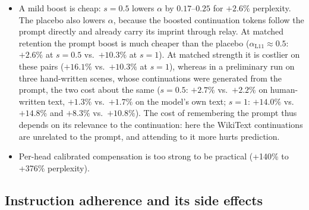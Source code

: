 \documentclass[11pt]{article}
\theoremstyle{definition}
\theoremstyle{remark}
\begin{document}
\begin{itemize}
  \item A mild boost is cheap: $s=0.5$ lowers $\alpha$ by $0.17$--$0.25$ for $+2.6\%$ perplexity. The placebo also lowers $\alpha$, because the boosted continuation tokens follow the prompt directly and already carry its imprint through relay. At matched retention the prompt boost is much cheaper than the placebo ($\alpha_{\text{L11}}\approx0.5$: $+2.6\%$ at $s=0.5$ vs.\ $+10.3\%$ at $s=1$). At matched strength it is costlier on these pairs ($+16.1\%$ vs.\ $+10.3\%$ at $s=1$), whereas in a preliminary run on three hand-written scenes, whose continuations were generated from the prompt, the two cost about the same ($s=0.5$: $+2.7\%$ vs.\ $+2.2\%$ on human-written text, $+1.3\%$ vs.\ $+1.7\%$ on the model's own text; $s=1$: $+14.0\%$ vs.\ $+14.8\%$ and $+8.3\%$ vs.\ $+10.8\%$). The cost of remembering the prompt thus depends on its relevance to the continuation: here the WikiText continuations are unrelated to the prompt, and attending to it more hurts prediction.
  \item Per-head calibrated compensation is too strong to be practical (+140\% to +376\% perplexity).
\end{itemize}

\subsection{Instruction adherence and its side effects}
\label{sec:app-adherence}
\end{document}
